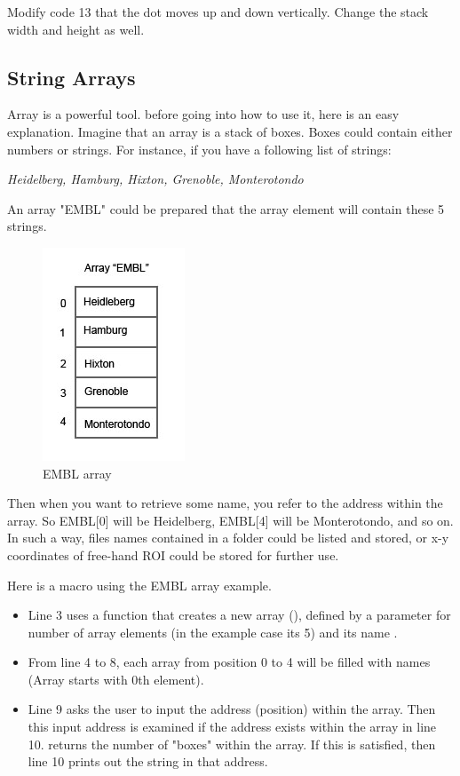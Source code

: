 \begin{indentexercise}{2}
Modify code 13 that the dot moves up and down vertically. Change the stack width and height as well. 
\end{indentexercise}

\subsection{String Arrays}
Array is a powerful tool. before going into how to use it, here is an easy explanation. 
Imagine that an array is a stack of boxes. Boxes could contain either numbers or strings. 
For instance, if you have a following list of strings:

\textit{Heidelberg, Hamburg, Hixton, Grenoble, Monterotondo}

An array "EMBL" could be prepared that the array element will contain these 5 strings. 

\begin{figure}[htbp]
\begin{center}
\includegraphics[scale=0.6]{fig/fig2441_arrayScheme.jpg}
\caption{EMBL array}
\label{figEMBLarray}
\end{center}
\end{figure} 
 
Then when you want to retrieve some name, you refer to the address within the array. 
So EMBL[0] will be Heidelberg, EMBL[4] will be Monterotondo, and so on. 
In such a way, files names contained in a folder could be listed and stored, 
or x-y coordinates of free-hand ROI could be stored for further use. 

Here is a macro using the EMBL array example. 



\begin{itemize}
\item Line 3 uses a function that creates a new array (),
defined by a parameter for number of array elements (in the example case its 5) and its name .
\item From line 4 to 8, each array from position 0 to 4 will be filled with
names (Array starts with 0th element).
\item Line 9 asks the user to input the address (position) within the array.
Then this input address is examined if the address exists within the
 array in line 10.  returns the number of "boxes"
within the array. If this is satisfied, then line 10 prints out the string in that address.
\end{itemize}

